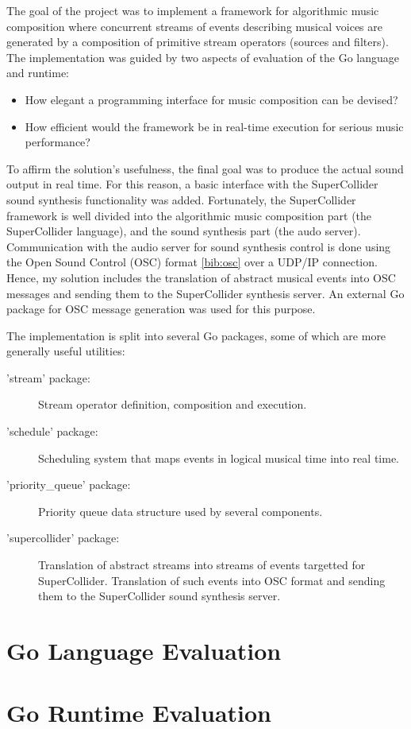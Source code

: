 \documentclass {article}
\begin{document}
The goal of the project was to implement a framework for algorithmic music composition where concurrent streams of events describing musical voices are generated by a composition of primitive stream operators (sources and filters). The implementation was guided by two aspects of evaluation of the Go language and runtime:

\begin{itemize}
\item How elegant a programming interface for music composition can be devised?
\item How efficient would the framework be in real-time execution for serious music performance?
\end{itemize}

To affirm the solution's usefulness, the final goal was to produce the actual sound output in real time. For this reason, a basic interface with the SuperCollider sound synthesis functionality was added. Fortunately, the SuperCollider framework is well divided into the algorithmic music composition part (the SuperCollider language), and the sound synthesis part (the audo server). Communication with the audio server for sound synthesis control is done using the Open Sound Control (OSC) format \ref{bib:osc} over a UDP/IP connection. Hence, my solution includes the translation of abstract musical events into OSC messages and sending them to the SuperCollider synthesis server. An external Go package for OSC message generation was used for this purpose.

The implementation is split into several Go packages, some of which are more generally useful utilities:

\begin{description}
\item['stream' package:] Stream operator definition, composition and execution.
\item['schedule' package:] Scheduling system that maps events in logical musical time into real time.
\item['priority\_queue' package:] Priority queue data structure used by several components.
\item['supercollider' package:] Translation of abstract streams into streams of events targetted for SuperCollider. Translation of such events into OSC format and sending them to the SuperCollider sound synthesis server.
\end{description}


\section{Go Language Evaluation}
\label{sec:language}

\section{Go Runtime Evaluation}
\label{sec:runtime}
\end{document}
